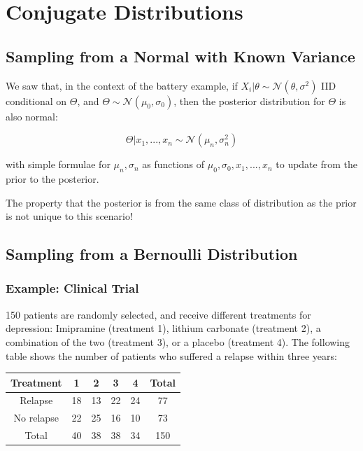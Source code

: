 \documentclass[a4paper]{article}
\begin{document}
    \newpage
    \section{Conjugate Distributions}
        \subsection{Sampling from a Normal with Known Variance}
            We saw that, in the context of the battery example, if $X_i | \theta
            \sim \mathcal{N}(\theta, \sigma^2)$ IID conditional on $\Theta$, and
            $\Theta \sim \mathcal{N}(\mu_0, \sigma_0)$, then the posterior
            distribution for $\Theta$ is also normal:

            $$
                \Theta | x_1, ..., x_n \sim \mathcal{N}(\mu_n, \sigma_n^2)
            $$

            with simple formulae for $\mu_n, \sigma_n$ as functions of $\mu_0,
            \sigma_0, x_1, ..., x_n$ to update from the prior to the posterior.

            The property that the posterior is from the same class of
            distribution as the prior is not unique to this scenario!

        \subsection{Sampling from a Bernoulli Distribution}
            \subsubsection{Example: Clinical Trial}
                150 patients are randomly selected, and receive different
                treatments for depression: Imipramine (treatment 1), lithium
                carbonate (treatment 2), a combination of the two (treatment 3),
                or a placebo (treatment 4). The following table shows the number
                of patients who suffered a relapse within three years:

                \begin{center}
                    \begin{tabular}{c | c c c c | c}
                        Treatment & 1 & 2 & 3 & 4 & Total \\
                        \hline
                        Relapse & 18 & 13 & 22 & 24 & 77 \\
                        No relapse & 22 & 25 & 16 & 10 & 73 \\
                        \hline
                        Total & 40 & 38 & 38 & 34 & 150
                    \end{tabular}
                \end{center}
\end{document}
